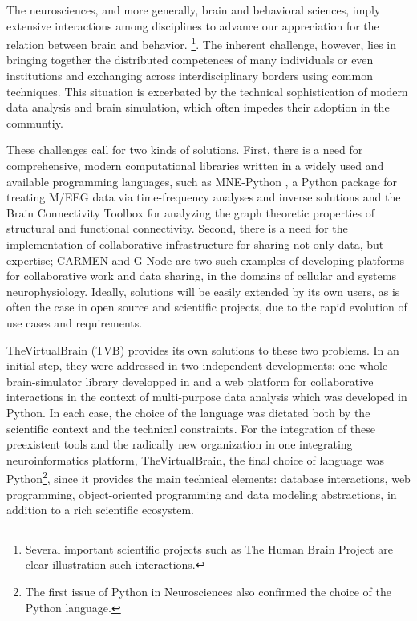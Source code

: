 The neurosciences, and more generally, brain and behavioral sciences, imply
extensive interactions among disciplines to advance our 
appreciation for the relation between brain and behavior. 
\footnote{Several important scientific projects such as The Human Brain Project are clear
illustration such interactions.}. 
The inherent challenge, however, lies in bringing together the distributed competences
of many individuals or even institutions and exchanging across interdisciplinary
borders using common techniques.  
This situation is excerbated by the technical sophistication of modern
data analysis and brain simulation, which often impedes their adoption 
in the communtiy.

These challenges call for two kinds of solutions. First, there is a need
for comprehensive, modern computational libraries written in a widely
used and available programming languages, such as MNE-Python \cite{mnepython},
a Python package for treating M/EEG data via time-frequency analyses and inverse
solutions and the Brain Connectivity
Toolbox \cite{rubinov2010complex} for analyzing the graph theoretic
properties of structural and functional connectivity. Second, there is
a need for the implementation
of collaborative infrastructure for sharing not only data, but expertise; 
CARMEN \cite{austin2011carmen} and G-Node \cite{herz2008g} are two such
examples of developing platforms for collaborative work and data sharing, 
in the domains of cellular and systems neurophysiology.
Ideally, solutions will be easily extended by its own users, as is often
the case in open source and scientific projects, due to the rapid 
evolution of use cases and requirements.

TheVirtualBrain (TVB) provides its own solutions to these two problems.  In an
initial step, they were addressed in two independent developments: one whole
brain-simulator library developped in \matlab{} and a web platform for
collaborative interactions in the context of multi-purpose data analysis which
was developed in Python.  In each case, the choice of the language was dictated
both by the scientific context and the technical constraints. For the
integration of these preexistent tools and the radically new organization in
one integrating neuroinformatics platform, TheVirtualBrain, the final choice of
language was Python\footnote{The first issue of Python in Neurosciences also
confirmed the choice of the Python language.}, since it provides the main
technical elements: database interactions, web programming, object-oriented
programming and data modeling abstractions, in addition to a rich scientific
ecosystem.

